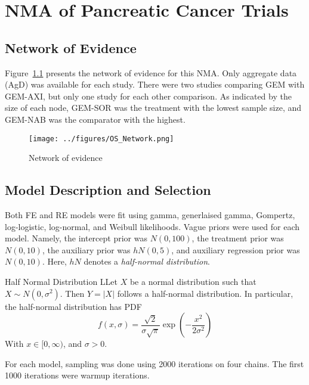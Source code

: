 \chapter{NMA of Pancreatic Cancer Trials}

\section{Network of Evidence}
Figure~\ref{fig:osnet} presents the network of evidence for this NMA. Only aggregate data (AgD) was available for each study. There were two studies comparing GEM with GEM-AXI, but only one study for each other comparison. As indicated by the size of each node, GEM-SOR was the treatment with the lowest sample size, and GEM-NAB was the comparator with the highest.

\begin{figure}[h]
    \centering
    \texttt{[image: ../figures/OS\_Network.png]}
    \caption{Network of evidence}
    \label{fig:osnet}
\end{figure}

\section{Model Description and Selection}
Both FE and RE models were fit using gamma, generlaised gamma, Gompertz, log-logistic, log-normal, and Weibull likelihoods. Vague priors were used for each model. Namely, the intercept prior was $N(0, 100)$, the treatment prior was $N(0, 10)$, the auxiliary prior was $hN(0, 5)$, and auxiliary regression prior was $N(0, 10)$. Here, $hN$ denotes a \textit{half-normal distribution}.

\begin{definition}{Half Normal Distribution}
    LLet $X$ be a normal distribution such that $X \sim N(0, \sigma^2)$. Then $Y = |X|$ follows a half-normal distribution. In particular, the half-normal distribution has PDF 
    \[
        f(x, \sigma) = \frac{\sqrt{2}}{\sigma \sqrt{\pi}}\exp \left(-\frac{x^2}{2\sigma^2}\right)    
    \]
    With $x \in [0, \infty)$, and $\sigma > 0$.
\end{definition}

For each model, sampling was done using 2000 iterations on four chains. The first 1000 iterations were warmup iterations. 